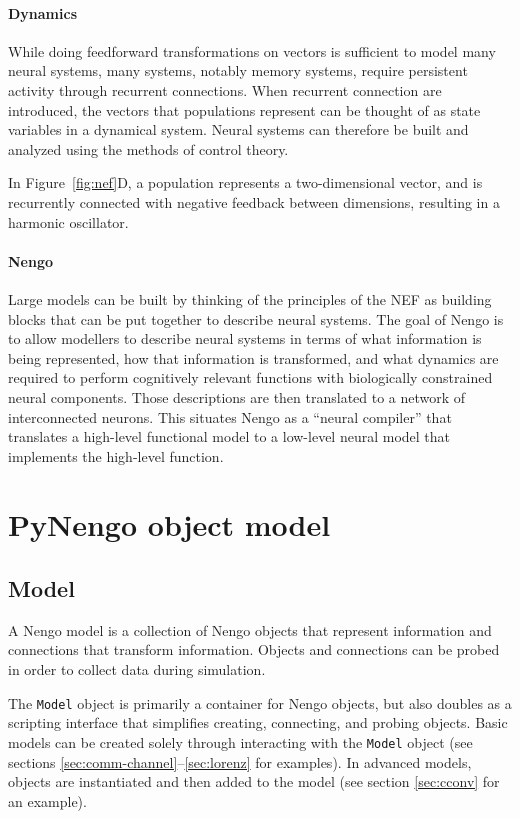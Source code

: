 \documentclass{frontiersSCNS}
\begin{document}
\paragraph{Dynamics}
While doing feedforward transformations
on vectors is sufficient to model
many neural systems,
many systems, notably memory systems,
require persistent activity through recurrent connections.
When recurrent connection are introduced,
the vectors that populations represent
can be thought of as state variables
in a dynamical system.
Neural systems can therefore
be built and analyzed using
the methods of control theory.

In Figure~\ref{fig:nef}D,
a population represents a two-dimensional vector,
and is recurrently connected
with negative feedback between dimensions,
resulting in a harmonic oscillator.

\paragraph{Nengo}
Large models can be built
by thinking of the principles of the NEF
as building blocks that can be put together
to describe neural systems.
The goal of Nengo is to allow
modellers to describe neural systems
in terms of what information is being represented,
how that information is transformed,
and what dynamics are required
to perform cognitively relevant
functions with biologically constrained
neural components.
Those descriptions are then
translated to a network
of interconnected neurons.
This situates Nengo
as a ``neural compiler''
that translates
a high-level functional model
to a low-level neural model
that implements the high-level function.

\section{PyNengo object model}

\subsection{Model}

A Nengo model is a collection
of Nengo objects that represent information
and connections that transform information.
Objects and connections can be probed
in order to collect data during simulation.

The \texttt{Model} object is primarily a container
for Nengo objects,
but also doubles as a scripting interface
that simplifies creating, connecting,
and probing objects.
Basic models
can be created solely through interacting
with the \texttt{Model} object
(see sections \ref{sec:comm-channel}--\ref{sec:lorenz}
for examples).
In advanced models,
objects are instantiated
and then added to the model
(see section \ref{sec:cconv} for an example).
\end{document}

